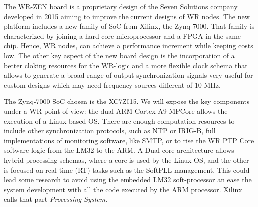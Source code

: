 
The WR-ZEN board is a proprietary design of the Seven 
Solutions company developed in 2015 aiming to improve the current designs of WR nodes.
The new platform includes a new family of SoC from Xilinx, the Zynq-7000. That family is characterized by joining a hard core microprocessor and a FPGA in the same chip. Hence, WR nodes, can achieve a performance increment while keeping costs low. The other key aspect of the new board design is the incorporation of a better cloking resources for the WR-logic and a more flexible clock schema that allows to generate a broad range of output synchronization signals very useful for custom designs which may need frequency sources different of 10 MHz.

The Zynq-7000 SoC chosen is the XC7Z015. We will expose the 
key components under a WR point of view: the dual ARM Cortex-A9 MPCore allows the execution of a Linux based OS. There are enough computation resources to include other synchronization protocols, such as NTP or IRIG-B, full implementations of monitoring software, like SMTP, or to rise the WR PTP Core software logic from the LM32 to the ARM. A Dual-core architecture allows hybrid processing schemas, where a core is used by the Linux OS, and the other is focused on real time (RT) tasks such as the SoftPLL management. This could lead 
some research to avoid using the embedded LM32 soft-processor an ease the system development with all the code executed by the ARM processor. Xilinx calls that part \textit{Processing System}.

